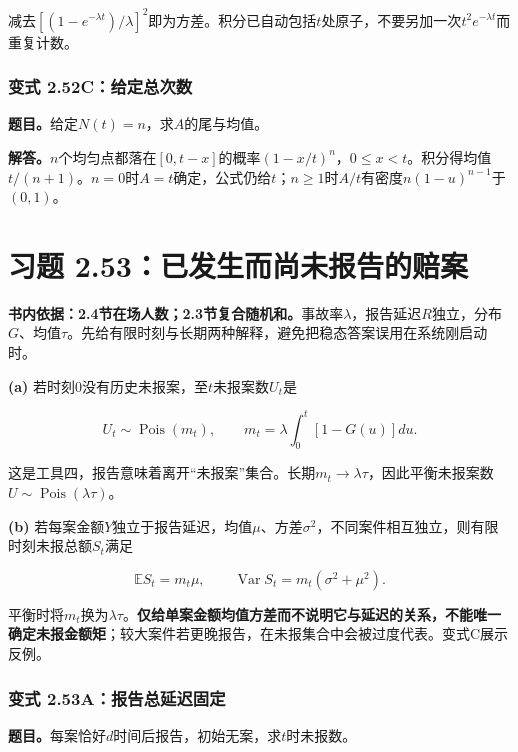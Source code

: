 \documentclass[12pt,a4paper,UTF8,fontset=fandol]{ctexart}
\begin{document}
减去\([(1-e^{-\lambda t})/\lambda]^2\)即为方差。积分已自动包括\(t\)处原子，不要另加一次\(t^2e^{-\lambda t}\)而重复计数。

\subsubsection{变式
2.52C：给定总次数}\label{ux53d8ux5f0f-2.52cux7ed9ux5b9aux603bux6b21ux6570}

\textbf{题目。}给定\(N(t)=n\)，求\(A\)的尾与均值。

\textbf{解答。}\(n\)个均匀点都落在\([0,t-x]\)的概率\((1-x/t)^n\)，\(0\le x<t\)。积分得均值\(t/(n+1)\)。\(n=0\)时\(A=t\)确定，公式仍给\(t\)；\(n\ge1\)时\(A/t\)有密度\(n(1-u)^{n-1}\)于\((0,1)\)。

\section{习题
2.53：已发生而尚未报告的赔案}\label{ux4e60ux9898-2.53ux5df2ux53d1ux751fux800cux5c1aux672aux62a5ux544aux7684ux8d54ux6848}

\textbf{书内依据：2.4节在场人数；2.3节复合随机和。}事故率\(\lambda\)，报告延迟\(R\)独立，分布\(G\)、均值\(\tau\)。先给有限时刻与长期两种解释，避免把稳态答案误用在系统刚启动时。

\textbf{(a)} 若时刻0没有历史未报案，至\(t\)未报案数\(U_t\)是

\[\boxed{U_t\sim\operatorname{Pois}(m_t),\qquad
m_t=\lambda\int_0^t[1-G(u)]du.}\]

这是工具四，报告意味着离开``未报案''集合。长期\(m_t\to\lambda\tau\)，因此平衡未报案数\(\boxed{U\sim\operatorname{Pois}(\lambda\tau)}\)。

\textbf{(b)}
若每案金额\(Y\)独立于报告延迟，均值\(\mu\)、方差\(\sigma^2\)，不同案件相互独立，则有限时刻未报总额\(S_t\)满足

\[\boxed{\mathbb ES_t=m_t\mu,\qquad
\operatorname{Var}S_t=m_t(\sigma^2+\mu^2).}\]

平衡时将\(m_t\)换为\(\lambda\tau\)。\textbf{仅给单案金额均值方差而不说明它与延迟的关系，不能唯一确定未报金额矩}；较大案件若更晚报告，在未报集合中会被过度代表。变式C展示反例。

\subsubsection{变式
2.53A：报告总延迟固定}\label{ux53d8ux5f0f-2.53aux62a5ux544aux603bux5ef6ux8fdfux56faux5b9a}

\textbf{题目。}每案恰好\(d\)时间后报告，初始无案，求\(t\)时未报数。
\end{document}
